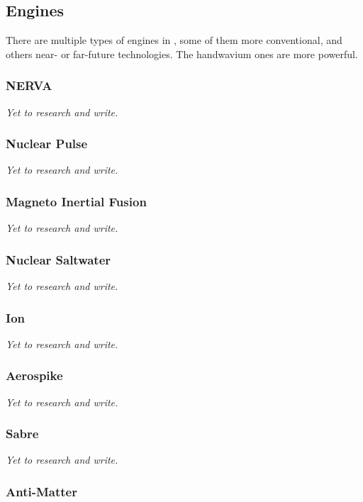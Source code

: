 \subsection{Engines}

There are multiple types of engines in \getTitle , some of them more conventional, and others near- or far-future technologies. The handwavium ones are more powerful.

\subsubsection{NERVA}

\textit{Yet to research and write.}

\subsubsection{Nuclear Pulse}

\textit{Yet to research and write.}

\subsubsection{Magneto Inertial Fusion}

\textit{Yet to research and write.}

\subsubsection{Nuclear Saltwater}

\textit{Yet to research and write.}

\subsubsection{Ion}

\textit{Yet to research and write.}

\subsubsection{Aerospike}

\textit{Yet to research and write.}

\subsubsection{Sabre}

\textit{Yet to research and write.}

\subsubsection{Anti-Matter}

